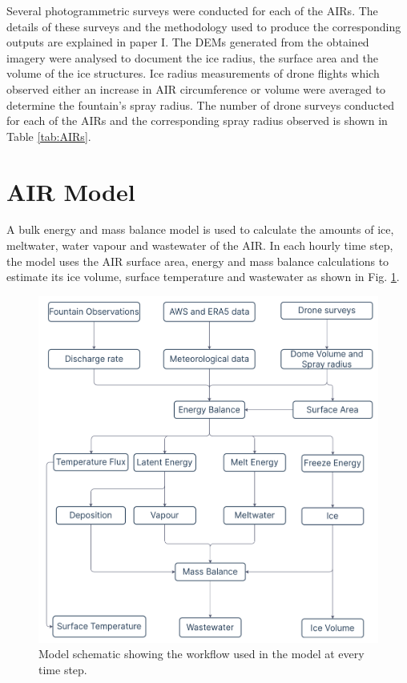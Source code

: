 Several photogrammetric surveys were conducted for each of the \ac{AIRs}. The details of these surveys and the
methodology used to produce the corresponding outputs are explained in paper I. The
\ac{DEMs} generated from the obtained imagery were analysed to document the ice radius, the surface area and the
volume of the ice structures. Ice radius measurements of drone flights which observed either an increase in AIR
circumference or volume were averaged to determine the fountain's spray radius. The number of drone surveys
conducted for each of the AIRs and the corresponding spray radius observed is shown in Table \ref{tab:AIRs}.

\section{AIR Model}

A bulk energy and mass balance model is used to calculate the amounts of ice, meltwater, water vapour and
wastewater of the AIR. In each hourly time step, the model uses the AIR surface area, energy and mass balance
calculations to estimate its ice volume, surface temperature and wastewater as shown in Fig. \ref{fig:schema}.

\begin{figure}
	\begin{center}
		\includegraphics[width=10 cm]{figs/model_schematic.jpg}
	\end{center}
	\caption{Model schematic showing the workflow used in the model at every time step. }
	\label{fig:schema}
\end{figure}

